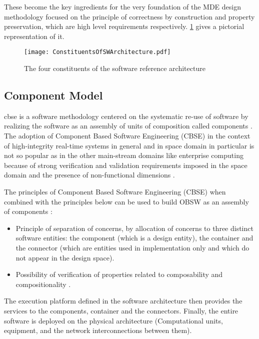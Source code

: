 These become the key ingredients for the very foundation of the MDE design methodology focused on the principle of correctness by construction and property preservation, which are high level requirements respectively. \cref{fig: Constituents of OSRA} gives a pictorial representation of it.

\begin{figure}[h]
	\centering
	\texttt{[image: ConstituentsOfSWArchitecture.pdf]}
	\caption{The four constituents of the software reference architecture}
	\label{fig: Constituents of OSRA}
\end{figure}

\subsection{Component Model}
\ac{cbse} is a software methodology centered on the systematic re-use of software by realizing the software as an assembly of units of composition called components \cite{CBSE}.
The adoption of Component Based Software Engineering (CBSE) in the context of high-integrity real-time systems in general and in space domain in particular is not so popular as in the other main-stream domains like enterprise computing because of strong verification and validation requirements imposed in the space domain and the presence of non-functional dimensions \cite{SAVOIR}.

The principles of Component Based Software Engineering (CBSE) when combined with the principles below can be used to build OBSW as an assembly of components \cite{SAVOIR}: 
\begin{itemize}
\item Principle of separation of concerns, by allocation of concerns to three distinct software entities: the component (which is a design entity), the container and the connector (which are entities used in implementation only and which do not appear in the design space).
\item Possibility of verification of properties related to composability and compositionality \cite{CompBasedDev}. 
\end{itemize}

The execution platform defined in the software architecture then provides the services to the components, container and the connectors. Finally, the entire software is deployed on the physical architecture (Computational units, equipment, and the network interconnections between them).

